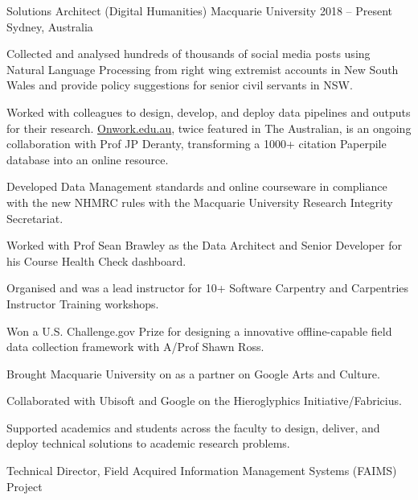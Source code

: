 

\begin{cventries}
\cventry
    {Solutions Architect (Digital Humanities)} %
    {Macquarie University} %
    {2018 -- Present} %
    {Sydney, Australia} %
    {\begin{cvitems}%
    \item {Collected and analysed hundreds of thousands of social media posts using Natural Language Processing from right wing extremist accounts in New South Wales and provide policy suggestions for senior civil servants in NSW.}
    \item {Worked with colleagues to design, develop, and deploy data pipelines and outputs for their research. \href{https://onwork.edu.au}{Onwork.edu.au}, twice featured in The Australian, is an ongoing collaboration with Prof JP Deranty, transforming a 1000+ citation Paperpile database into an online resource.}
    \item {Developed Data Management standards and online courseware in compliance with the new NHMRC rules with the Macquarie University Research Integrity Secretariat.}
    \item {Worked with Prof Sean Brawley as the Data Architect and Senior Developer for his Course Health Check dashboard. }
    \item {Organised and was a lead instructor for 10+ Software Carpentry and Carpentries Instructor Training workshops.}
    \item {Won a U.S. Challenge.gov Prize for designing a innovative offline-capable field data collection framework with A/Prof Shawn Ross.}
    \item {Brought Macquarie University on as a partner on Google Arts and Culture.}
    \item {Collaborated with Ubisoft and Google on the Hieroglyphics Initiative/Fabricius.}
    \item {Supported academics and students across the faculty to design, deliver, and deploy technical solutions to academic research problems.}
    \end{cvitems}%
    }
    \cventry
    {Technical Director, Field Acquired Information Management Systems (FAIMS) Project} %

\end{cventries}
